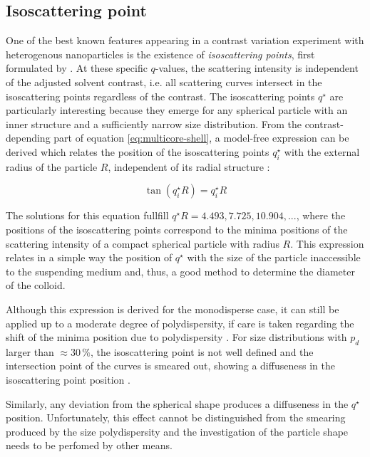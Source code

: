  
\subsection{Isoscattering point}
\label{sec:isopoint_theory}
One of the best known features appearing in a contrast variation experiment with heterogenous nanoparticles is the existence of \emph{isoscattering points}, first formulated by \citep{kawaguchi_x-ray_1983-1}. At these specific \( q\)-values, the scattering intensity is independent of the adjusted solvent contrast, i.e. all scattering curves intersect in the isoscattering points regardless of the contrast. The isoscattering points \(q^{\star}\) are particularly interesting because they emerge for any spherical particle with an inner structure and a sufficiently narrow size distribution. From the contrast-depending part of equation \eqref{eq:multicore-shell}, a model-free expression can be derived which relates the position of the isoscattering points \(q^{\star}_i\) with the external radius of the particle \( R \), independent of its radial structure \citep{kawaguchi_x-ray_1983-1,kawaguchi_isoscattering_1992}:

\begin{equation}
        \label{eq:isoscattering}
        \tan(q^{\star}_iR)=q^{\star}_iR
\end{equation}

The solutions for this equation fullfill $q^{\star} R =4.493, 7.725, 10.904, ...$, where the positions of the isoscattering points correspond to the minima positions of the scattering intensity of a compact spherical particle with radius \( R \). This expression relates in a simple way the position of $q^{\star}$ with the size of the particle inaccessible to the suspending medium and, thus, a good method to determine the diameter of the colloid.

Although this expression is derived for the monodisperse case, it can still be applied up to a moderate degree of polydispersity, if care is taken regarding the shift of the minima position due to polydispersity \citep{beurten_polydispersity_1981}. For size distributions with \( p_d\) larger than \( \approx 30\,\% \), the isoscattering point is not well defined and the intersection point of the curves is smeared out, showing a diffuseness in the isoscattering point position \citep{kawaguchi_isoscattering_1992}.

Similarly, any deviation from the spherical shape produces a diffuseness in the $q^{\star}$ position. Unfortunately, this effect cannot be distinguished from the smearing produced by the size polydispersity and the investigation of the particle shape needs to be perfomed by other means.



